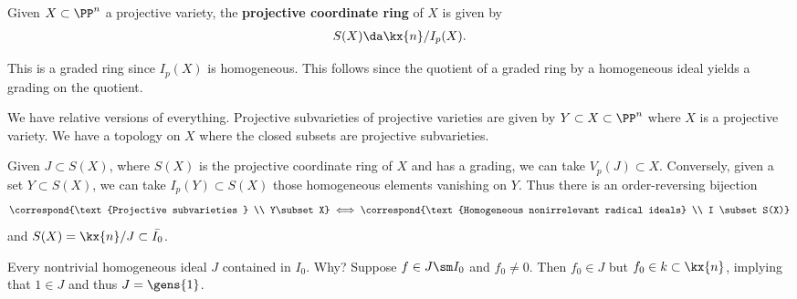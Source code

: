 \begin{definition}

Given \(X\subset \PP^n\) a projective variety, the \textbf{projective
coordinate ring} of \(X\) is given by
\begin{align*}  
S(X) \da \kx{n} / I_p(X)
.\end{align*}

\end{definition}

\begin{remark}

This is a graded ring since \(I_p(X)\) is homogeneous. This follows
since the quotient of a graded ring by a homogeneous ideal yields a
grading on the quotient.

\end{remark}

\begin{remark}

We have relative versions of everything. Projective subvarieties of
projective varieties are given by \(Y\subset X\subset \PP^n\) where
\(X\) is a projective variety. We have a topology on \(X\) where the
closed subsets are projective subvarieties.

\end{remark}

\begin{remark}

Given \(J\subset S(X)\), where \(S(X)\) is the projective coordinate
ring of \(X\) and has a grading, we can take \(V_p(J) \subset X\).
Conversely, given a set \(Y\subset S(X)\), we can take
\(I_p(Y) \subset S(X)\) those homogeneous elements vanishing on \(Y\).
Thus there is an order-reversing bijection
\begin{align*}  
\correspond{\text{Projective subvarieties } \\ Y\subset X}
\iff
\correspond{\text{Homogeneous nonirrelevant radical ideals} \\ I \subset S(X)}
\end{align*} and \(S(X) = \kx{n}/J \subset \bar{I_0}\).

\end{remark}

\begin{remark}

Every nontrivial homogeneous ideal \(J\) contained in \(I_0\). Why?
Suppose \(f\in J\sm I_0\) and \(f_0\neq 0\). Then \(f_0\in J\) but
\(f_0\in k\subset \kx{n}\), implying that \(1\in J\) and thus
\(J = \gens{1}\).

\end{remark}

